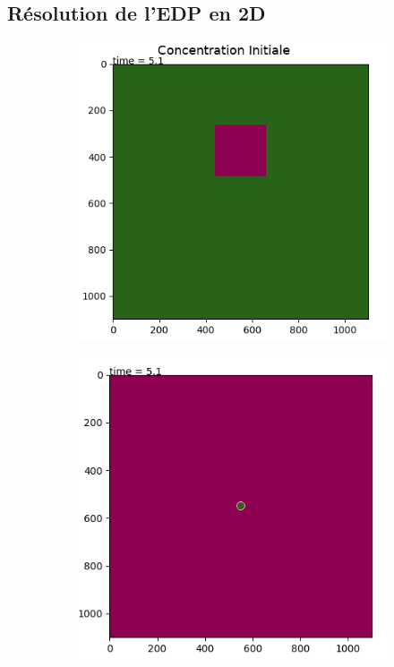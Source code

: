 \documentclass[11pt]{article}
\begin{document}
\newpage
\subsection{Résolution de l'EDP en 2D}

\begin{figure}[hbt!]
\centering
\begin{subfigure}[b]{\textwidth}
\includegraphics[width=.35\textwidth]{Images/CInitial.png}
\end{subfigure}
\begin{subfigure}[b]{0.45\textwidth}
\includegraphics[width=\textwidth]{Images/Rho2d0.png}
\end{subfigure}
\begin{subfigure}[b]{0.45\textwidth}

\end{subfigure}
\end{figure}
\end{document}
